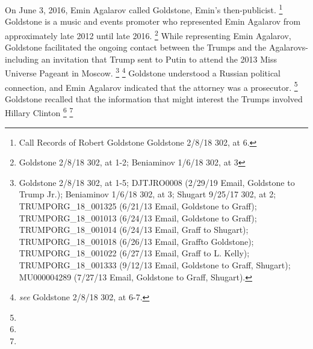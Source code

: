 On June 3, 2016, Emin Agalarov called Goldstone, Emin's then-publicist.%
\footnote{Call Records of Robert Goldstone  Goldstone 2/8/18 302, at 6.}
Goldstone is a music and events promoter who represented Emin Agalarov from approximately late 2012 until late 2016.%
\footnote{Goldstone 2/8/18 302, at 1-2;  Beniaminov 1/6/18 302, at 3}
While representing Emin Agalarov, Goldstone facilitated the ongoing contact between the Trumps and the Agalarovs-including an invitation that Trump sent to Putin to attend the 2013 Miss Universe Pageant in Moscow.%
\footnote{Goldstone 2/8/18 302, at 1-5; 
DJTJRO0008 (2/29/19 Email, Goldstone to Trump Jr.); 
Beniaminov 1/6/18 302, at 3; 
Shugart 9/25/17 302, at 2;
TRUMPORG\_18\_001325 (6/21/13 Email, Goldstone to Graff); 
TRUMPORG\_18\_001013 (6/24/13 Email, Goldstone to Graff); 
TRUMPORG\_18\_001014 (6/24/13 Email, Graff to Shugart);
TRUMPORG\_18\_001018 (6/26/13 Email, Graffto Goldstone); 
TRUMPORG\_18\_001022 (6/27/13 Email, Graff to L. Kelly); 
TRUMPORG\_18\_001333 (9/12/13 Email, Goldstone to Graff, Shugart);
MU000004289 (7/27/13 Email, Goldstone to Graff, Shugart).}
\footnote{ \textit{see} Goldstone 2/8/18 302, at 6-7.}
Goldstone understood
a Russian political connection, and Emin Agalarov indicated that the attorney was a prosecutor.%
\footnote{}
Goldstone recalled that the information that might interest the Trumps involved Hillary Clinton
\footnote{}
\footnote{}

